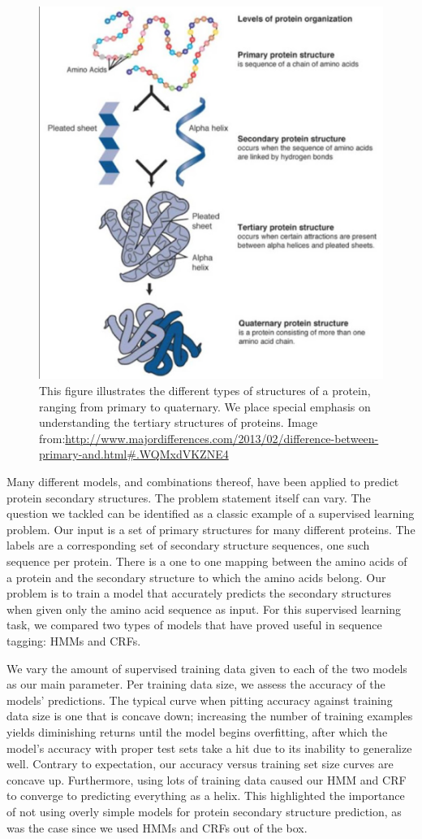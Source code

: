 \documentclass[11 pt, twocolumn]{article}
\begin{document}
\begin{figure}
\centering
\includegraphics[width = .4\textwidth]{StructuresOfProteins.png}
\caption{This figure illustrates the different types of structures of a protein, ranging from primary to quaternary. We place special emphasis on understanding the tertiary structures of proteins. Image from:\url{http://www.majordifferences.com/2013/02/difference-between-primary-and.html\#.WQMxdVKZNE4}}
\label{fig:proteinStructure}
\end{figure}

Many different models, and combinations thereof, have been applied to predict protein secondary structures. The problem statement itself can vary. The question we tackled can be identified as a classic example of a supervised learning problem. Our input is a set of primary structures for many different proteins. The labels are a corresponding set of secondary structure sequences, one such sequence per protein. There is a one to one mapping between the amino acids of a protein and the secondary structure to which the amino acids belong. Our problem is to train a model that accurately predicts the secondary structures when given only the amino acid sequence as input. For this supervised learning task, we compared two types of models that have proved useful in sequence tagging: HMMs and CRFs. 

We vary the amount of supervised training data given to each of the two models as our main parameter. Per training data size, we assess the accuracy of the models’ predictions. The typical curve when pitting accuracy against training data size is one that is concave down; increasing the number of training examples yields diminishing returns until the model begins overfitting, after which the model's accuracy with proper test sets take a hit due to its inability to generalize well. Contrary to expectation, our accuracy versus training set size curves are concave up. Furthermore, using lots of training data caused our HMM and CRF to converge to predicting everything as a helix.  This highlighted the importance of not using overly simple models for protein secondary structure prediction, as was the case since we used HMMs and CRFs out of the box. 
\end{document}
